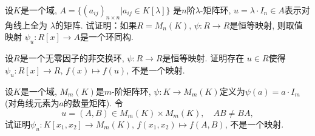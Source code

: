 \begin{solution}
    
\end{solution}

\begin{problem}
    设$K$是一个域, $A = \{(a_{ij})_{n \times n}|a_{ij} \in K[\lambda]\}$
是$n$阶$\lambda$-矩阵环, $u = \lambda \cdot I_n \in A$表示对角线上全为
$\lambda$的矩阵. 试证明：如果$R = M_n(K),\, \psi:R \to R$是恒等映射, 则取值映射
$\psi_u:R[x] \to A$是一个环同构.
\end{problem}

\begin{solution}
    
\end{solution}

\begin{problem}
    设$R$是一个无零因子的非交换环, $\psi:R \to R$是恒等映射. 证明存在
$u \in R$使得$\psi _u:R[x] \to R$, $f(x) \mapsto f(u)$,
不是一个映射.
\end{problem}

\begin{solution}
    
\end{solution}

\begin{problem}
    设$K$是一个域, $M_m(K)$是$m$-阶矩阵环,
$\psi:K \to M_m(K)$定义为$\psi(a) = a \cdot I_{m}$
(对角线元素为$a$的数量矩阵). 令
\[
    u = (A, B) \in M_m(K) \times M_m(K),\quad AB \neq BA,
\]
试证明$\psi_u:K[x_1, x_2] \to M_m(K),\, f(x_1, x_2) \mapsto f(A, B)$,
不是一个映射.
\end{problem}

\begin{solution}
    
\end{solution}